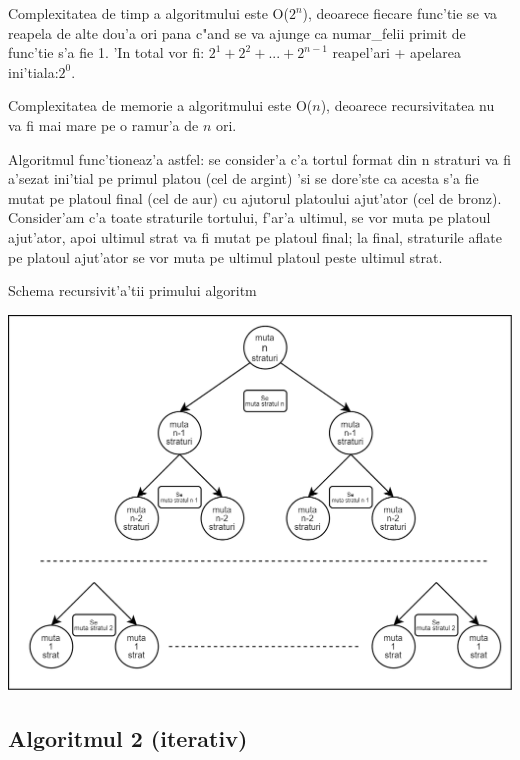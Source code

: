 \documentclass{article}
\begin{document}
Complexitatea de timp a algoritmului este O($2^n$), deoarece fiecare func'tie se va reapela de alte dou'a ori pana c"and se va ajunge ca numar\_felii primit de func'tie s'a fie 1. 'In total vor fi: $2^1+2^2+...+2^{n-1}$ reapel'ari + apelarea ini'tiala:$2^0$.

Complexitatea de memorie a algoritmului este O($n$), deoarece recursivitatea nu va fi mai mare pe o ramur'a de $n$ ori.

Algoritmul func'tioneaz'a astfel: se consider'a c'a tortul format din n straturi va fi a'sezat ini'tial pe primul platou (cel de argint) 'si se dore'ste ca acesta s'a fie mutat pe platoul final (cel de aur) cu ajutorul platoului ajut'ator (cel de bronz).
Consider'am c'a toate straturile tortului, f'ar'a ultimul, se vor muta pe platoul ajut'ator, apoi ultimul strat va fi mutat pe platoul final; la final, straturile aflate pe platoul ajut'ator se vor muta pe ultimul platoul peste ultimul strat.

\newpage

{\Large Schema recursivit'a'tii primului algoritm}

\includegraphics[scale=0.3]{DiagramaRecursivitateaALG1}\\

\subsection{Algoritmul 2 (iterativ)}
\end{document}
